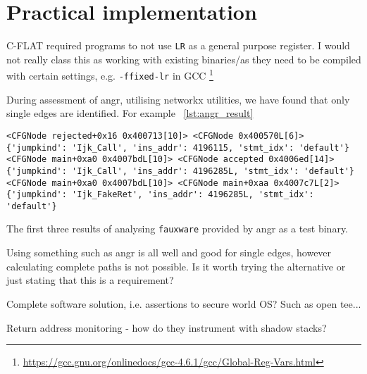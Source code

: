 \section{Practical implementation}

C-FLAT required programs to not use \verb|LR| as a general purpose register. I would not really class this as working with existing binaries\slash as they need to be compiled with certain settings, e.g. \verb|-ffixed-lr| in GCC \footnote{\url{https://gcc.gnu.org/onlinedocs/gcc-4.6.1/gcc/Global-Reg-Vars.html}}

During assessment of angr, utilising networkx utilities, we have found that only single edges are identified. For example ~\ref{lst:angr_result}

\begin{lstlisting}[caption={Example of results from angr CFG analysis of fauxware in form of .edgelist output from networkx utilities},label={lst:angr_result}]
<CFGNode rejected+0x16 0x400713[10]> <CFGNode 0x400570L[6]> {'jumpkind': 'Ijk_Call', 'ins_addr': 4196115, 'stmt_idx': 'default'}
<CFGNode main+0xa0 0x4007bdL[10]> <CFGNode accepted 0x4006ed[14]> {'jumpkind': 'Ijk_Call', 'ins_addr': 4196285L, 'stmt_idx': 'default'}
<CFGNode main+0xa0 0x4007bdL[10]> <CFGNode main+0xaa 0x4007c7L[2]> {'jumpkind': 'Ijk_FakeRet', 'ins_addr': 4196285L, 'stmt_idx': 'default'}
\end{lstlisting}

The first three results of analysing \verb|fauxware| provided by angr as a test binary. 

Using something such as angr is all well and good for single edges, however calculating complete paths is not possible. Is it worth trying the alternative or just stating that this is a requirement?

Complete software solution, i.e. assertions to secure world OS? Such as open tee... 

Return address monitoring - how do they instrument with shadow stacks?

